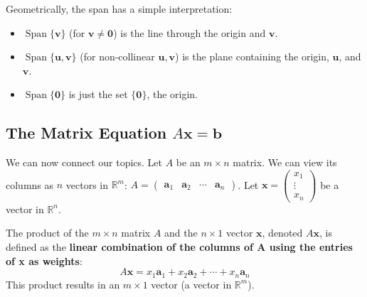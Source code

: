Geometrically, the span has a simple interpretation:
\begin{itemize}
    \item $\operatorname{Span}\{\mathbf{v}\}$ (for $\mathbf{v} \neq \mathbf{0}$) is the line through the origin and $\mathbf{v}$.
    \item $\operatorname{Span}\{\mathbf{u}, \mathbf{v}\}$ (for non-collinear $\mathbf{u}, \mathbf{v}$) is the plane containing the origin, $\mathbf{u}$, and $\mathbf{v}$.
    \item $\operatorname{Span}\{\mathbf{0}\}$ is just the set $\{\mathbf{0}\}$, the origin.
\end{itemize}
%

\subsection{The Matrix Equation $A\mathbf{x} = \mathbf{b}$}

We can now connect our topics.
Let $A$ be an $m \times n$ matrix. We can view its columns as $n$ vectors in $\mathbb{R}^m$:
$A = \begin{pmatrix} \mathbf{a}_1 & \mathbf{a}_2 & \cdots & \mathbf{a}_n \end{pmatrix}$.
Let $\mathbf{x} = \begin{pmatrix} x_1 \\ \vdots \\ x_n \end{pmatrix}$ be a vector in $\mathbb{R}^n$.

\begin{definition}
The product of the $m \times n$ matrix $A$ and the $n \times 1$ vector $\mathbf{x}$, denoted $A\mathbf{x}$, is defined as the \textbf{linear combination of the columns of A using the entries of x as weights}:
\[
A\mathbf{x} = x_1\mathbf{a}_1 + x_2\mathbf{a}_2 + \cdots + x_n\mathbf{a}_n
\]
This product results in an $m \times 1$ vector (a vector in $\mathbb{R}^m$).
\end{definition}

